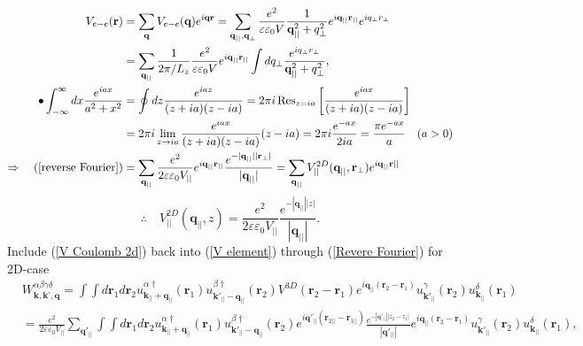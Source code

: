 \documentclass[12pt,english,a4paper]{article}
\newcommand{\dg}{\dagger}
\begin{document}
\begin{appendices}
\begin{align}
	\label{reverse Fourier}
	V_{e-e} (\textbf{r}) &= \sum_{\textbf{q}}V_{e-e}(\textbf{q}) e^{i\textbf{q}\textbf{r}} = \sum_{\textbf{q}_{||},\textbf{q}_{\perp}} \frac{e^2}{\varepsilon \varepsilon_0 V} \frac{1}{\textbf{q}_{||}^2 +q_{\perp}^2} e^{i\textbf{q}_{||}\textbf{r}_{||}} e^{iq_{\perp} r_{\perp}} \nonumber \\
	&= \sum_{\textbf{q}_{||}}\frac{1}{2\pi/L_z}\frac{e^2}{\varepsilon \varepsilon_0 V} e^{i\textbf{q}_{||} \textbf{r}_{||}} \int dq_{\perp}\frac{e^{iq_{\perp}r_{\perp}}}{\textbf{q}_{||}^2 +q_{\perp}^2}, \\ \bullet
	\int_{-\infty}^{\infty} dx \frac{e^{iax}}{a^2 +x^2} &= \oint dz \frac{e^{iaz}}{(z+ia)(z - ia)} = 2\pi i\Res_{z=ia}\bigg[\frac{e^{iax}}{(z+ia)(z - ia)}\bigg] \nonumber\\
	&= 2\pi i \lim_{z \to ia}\frac{e^{iax}}{(z+ia)(z - ia)} (z-ia) = 2\pi i \frac{e^{-ax}}{2ia} = \frac{\pi e^{-ax}}{a} \quad (a > 0)\\ \label{Revere Fourier}
	 \Rightarrow \quad 
	(\ref{reverse Fourier}) &= \sum_{\textbf{q}_{||}} \frac{e^2}{2 \varepsilon \varepsilon_0 V_{||} }e^{i\textbf{q}_{||} \textbf{r}_{||}} \frac{e^{-|\textbf{q}_{||}||\textbf{r}_{\perp}|}}{|\textbf{q}_{||}|} = \sum_{\textbf{q}_{||}}V^{2D}_{||}(\textbf{q}_{||}, \textbf{r}_\perp) e^{i\textbf{q}_{||}\textbf{r}{||}}
\end{align}
\begin{equation}
	\label{V Coulomb 2d}
	\therefore \quad V^{2D}_{||}(\textbf{q}_{||}, z) = \frac{e^2}{2 \varepsilon \varepsilon_0 V_{||} }\frac{e^{- |\textbf{q}_{||}| |z|}}{|\textbf{q}_{||}|}.
\end{equation}
\quad Include (\ref{V Coulomb 2d}) back into (\ref{V element}) through (\ref{Revere Fourier}) for 2D-case
\begin{align}
	&W^{\alpha\beta\gamma \delta}_{\textbf{k},\textbf{k'},\textbf{q}}= \int \int d\textbf{r}_1 d\textbf{r}_2 u_{\textbf{k}_{||}+\textbf{q}_{||}}^{\alpha\dg}(\textbf{r}_1) u ^{\beta \dg}_{\textbf{k}'_{||}-\textbf{q}_{||}}(\textbf{r}_2) V^{3D}(\textbf{r}_2 - \textbf{r}_1) e^{i\textbf{q}_{||}(\textbf{r}_2 - \textbf{r}_1)} u^\gamma_{\textbf{k}'_{||}}(\textbf{r}_2) u^{\delta}_{\textbf{k}_{||}}(\textbf{r}_1)\\
	&=\frac{e^2}{2 \varepsilon \varepsilon_0 V_{||}}\sum_{\textbf{q}'_{||}}\int \int d\textbf{r}_1 d\textbf{r}_2 u_{\textbf{k}_{||}+\textbf{q}_{||}}^{\alpha\dg}(\textbf{r}_1) u ^{\beta \dg}_{\textbf{k}'_{||}-\textbf{q}_{||}}(\textbf{r}_2)e^{i\textbf{q}'_{||} (\textbf{r}_{2||} - \textbf{r}_{1||})}\frac{e^{-|\textbf{q}'_{||}||z_2-z_1|}}{|\textbf{q}'_{||}|} e^{i\textbf{q}_{||}(\textbf{r}_2 - \textbf{r}_1)} u^\gamma_{\textbf{k}'_{||}}(\textbf{r}_2) u^{\delta}_{\textbf{k}_{||}}(\textbf{r}_1)\nonumber,

\end{align}
\end{appendices}
\end{document}
